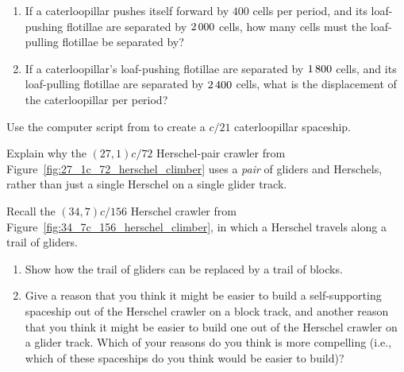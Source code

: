 \begin{multicols}{2}
\begin{problem}
	\begin{enumerate}[label=\bf\color{ocre}(\alph*)]
		\item If a caterloopillar pushes itself forward by $400$ cells per period, and its loaf-pushing flotillae are separated by $2{\,}000$ cells, how many cells must the loaf-pulling flotillae be separated by?
		
		\item If a caterloopillar's loaf-pushing flotillae are separated by $1{\,}800$ cells, and its loaf-pulling flotillae are separated by $2{\,}400$ cells, what is the displacement of the caterloopillar per period?
	\end{enumerate}
\end{problem}


\mfilbreak


\begin{problem}\label{exer:caterloopillar_make_via_script} 
	Use the computer script from  to create a $c/21$ caterloopillar spaceship.
\end{problem}


\mfilbreak


\begin{problem}\label{exer:27_1c_72_why_two} 
	Explain why the $(27,1)c/72$ Herschel-pair crawler from Figure~\ref{fig:27_1c_72_herschel_climber} uses a \emph{pair} of gliders and Herschels, rather than just a single Herschel on a single glider track.
\end{problem}


\mfilbreak


\begin{problemstar}\label{exer:34_7c_156_with_blocks} 
	Recall the $(34,7)c/156$ Herschel crawler from Figure~\ref{fig:34_7c_156_herschel_climber}, in which a Herschel travels along a trail of gliders.\smallskip
	
	\begin{enumerate}[label=\bf\color{ocre}(\alph*)]
		\item Show how the trail of gliders can be replaced by a trail of blocks.
		
		\item Give a reason that you think it might be easier to build a self-supporting spaceship out of the Herschel crawler on a block track, and another reason that you think it might be easier to build one out of the Herschel crawler on a glider track. Which of your reasons do you think is more compelling (i.e., which of these spaceships do you think would be easier to build)?
	\end{enumerate}
\end{problemstar}



\end{multicols}
